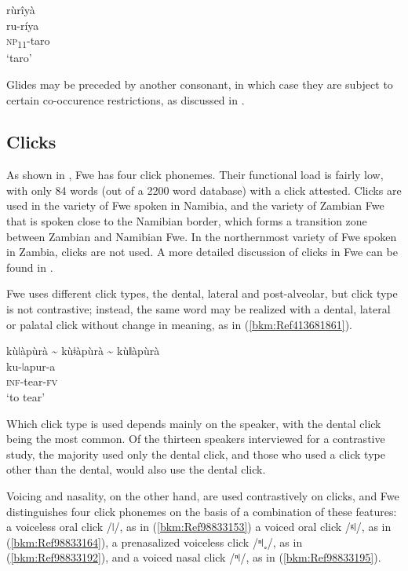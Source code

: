 \ea
\label{bkm:Ref505356582}
\glll rùrîyà\\
ru-ríya\\
\textsc{np}\textsubscript{11}-taro\\
\glt ‘taro’
\z

Glides may be preceded by another consonant, in which case they are subject to certain co-occurence restrictions, as discussed in .

\subsection{Clicks}

As shown in , Fwe has four click phonemes. Their functional load is fairly low, with only 84 words (out of a 2200 word database) with a click attested. Clicks are used in the variety of Fwe spoken in Namibia, and the variety of Zambian Fwe that is spoken close to the Namibian border, which forms a transition zone between Zambian and Namibian Fwe. In the northernmost variety of Fwe spoken in Zambia, clicks are not used. A more detailed discussion of clicks in Fwe can be found in {\citet{Gunnink2020}}.

Fwe uses different click types, the dental, lateral and post-alveolar, but click type is not contrastive; instead, the same word may be realized with a dental, lateral or palatal click without change in meaning, as in (\ref{bkm:Ref413681861}).

\ea
\label{bkm:Ref413681861}
kùǀàpùrà {\textasciitilde} kùǂàpùrà {\textasciitilde} kùǁàpùrà\\
ku-ǀapur-a\\
\textsc{inf}-tear-\textsc{fv}\\
\glt ‘to tear’
\z

Which click type is used depends mainly on the speaker, with the dental click being the most common. Of the thirteen speakers inter\-viewed for a contrastive study, the majority used only the dental click, and those who used a click type other than the dental, would also use the dental click.

Voicing and nasality, on the other hand, are used contrastively on clicks, and Fwe distinguishes four click phonemes on the basis of a combination of these features: a voiceless oral click /ǀ/, as in (\ref{bkm:Ref98833153}) a voiced oral click /ᵍǀ/, as in (\ref{bkm:Ref98833164}), a prenasalized voiceless click /ⁿǀ˳/,\textsuperscript{} as in (\ref{bkm:Ref98833192}), and a voiced nasal click /ⁿǀ/, as in (\ref{bkm:Ref98833195}).

